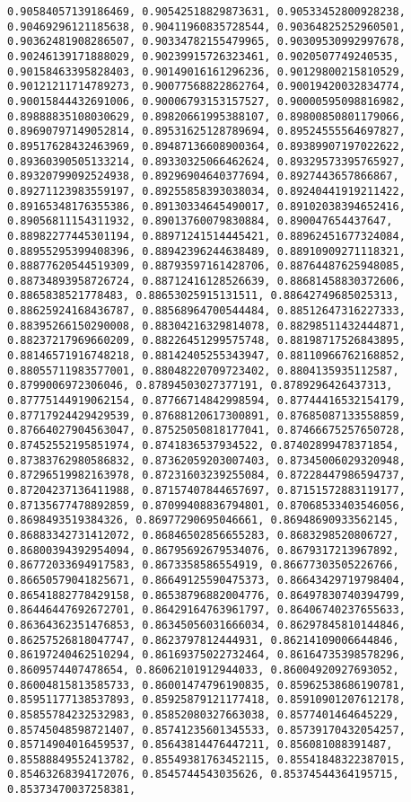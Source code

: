 \documentclass[11pt]{article}
\begin{document}
\begin{Verbatim}[commandchars=\\\{\}]
0.90584057139186469, 0.90542518829873631, 0.90533452800928238, 0.90469296121185638, 0.90411960835728544, 0.90364825252960501, 0.90362481908286507, 0.90334782155479965, 0.90309530992997678, 0.90246139171888029, 0.90239915726323461, 0.9020507749240535, 0.90158463395828403, 0.90149016161296236, 0.90129800215810529, 0.90121211714789273, 0.90077568822862764, 0.90019420032834774, 0.90015844432691006, 0.90006793153157527, 0.90000595098816982, 0.89888835108030629, 0.89820661995388107, 0.89800850801179066, 0.89690797149052814, 0.89531625128789694, 0.89524555564697827, 0.89517628432463969, 0.89487136608900364, 0.89389907197022622, 0.89360390505133214, 0.89330325066462624, 0.89329573395765927, 0.89320799092524938, 0.89296904640377694, 0.8927443657866867, 0.89271123983559197, 0.89255858393038034, 0.89240441919211422, 0.89165348176355386, 0.89130334645490017, 0.89102038394652416, 0.89056811154311932, 0.89013760079830884, 0.890047654437647, 0.88982277445301194, 0.88971241514445421, 0.88962451677324084, 0.88955295399408396, 0.88942396244638489, 0.88910909271118321, 0.88877620544519309, 0.88793597161428706, 0.88764487625948085, 0.88734893958726724, 0.88712416128526639, 0.88681458830372606, 0.8865838521778483, 0.88653025915131511, 0.88642749685025313, 0.88625924168436787, 0.88568964700544484, 0.88512647316227333, 0.88395266150290008, 0.88304216329814078, 0.88298511432444871, 0.88237217969660209, 0.88226451299575748, 0.88198717526843895, 0.88146571916748218, 0.88142405255343947, 0.88110966762168852, 0.88055711983577001, 0.88048220709723402, 0.8804135935112587, 0.8799006972306046, 0.87894503027377191, 0.8789296426437313, 0.87775144919062154, 0.87766714842998594, 0.87744416532154179, 0.87717924429429539, 0.87688120617300891, 0.87685087133558859, 0.87664027904563047, 0.87525050818177041, 0.87466675257650728, 0.87452552195851974, 0.8741836537934522, 0.87402899478371854, 0.87383762980586832, 0.87362059203007403, 0.87345006029320948, 0.87296519982163978, 0.87231603239255084, 0.87228447986594737, 0.87204237136411988, 0.87157407844657697, 0.87151572883119177, 0.87135677478892859, 0.87099408836794801, 0.87068533403546056, 0.8698493519384326, 0.86977290695046661, 0.86948690933562145, 0.86883342731412072, 0.86846502856655283, 0.8683298520806727, 0.86800394392954094, 0.86795692679534076, 0.8679317213967892, 0.86772033694917583, 0.8673358586554919, 0.86677303505226766, 0.86650579041825671, 0.86649125590475373, 0.86643429719798404, 0.86541882778429158, 0.86538796882004776, 0.86497830740394799, 0.86446447692672701, 0.86429164763961797, 0.86406740237655633, 0.86364362351476853, 0.86345056031666034, 0.86297845810144846, 0.86257526818047747, 0.8623797812444931, 0.86214109006644846, 0.86197240462510294, 0.86169375022732464, 0.86164735398578296, 0.8609574407478654, 0.86062101912944033, 0.86004920927693052, 0.86004815813585733, 0.86001474796190835, 0.85962538686190781, 0.85951177138537893, 0.85925879121177418, 0.85910901207612178, 0.85855784232532983, 0.85852080327663038, 0.8577401464645229, 0.85745048598721407, 0.85741235601345533, 0.85739170432054257, 0.85714904016459537, 0.85643814476447211, 0.856081088391487, 0.85588849552413782, 0.85549381763452115, 0.85541848322387015, 0.85463268394172076, 0.8545744543035626, 0.85374544364195715, 0.85373470037258381, 
\end{Verbatim}
\end{document}
